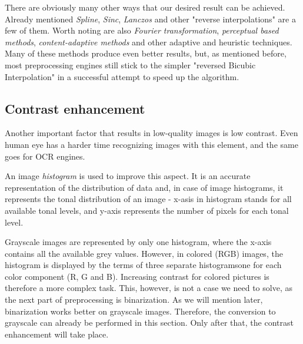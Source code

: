 \begin{description}
There are obviously many other ways that our desired result can be achieved. Already mentioned \emph{Spline}, \emph{Sinc}, \emph{Lanczos} and other "reverse interpolations" are a few of them. Worth noting are also \emph{Fourier transformation}, \emph{perceptual based methods}, \emph{content-adaptive methods} and other adaptive and heuristic techniques.
Many of these methods produce even better results, but, as mentioned before, most preprocessing engines still stick to the simpler "reversed Bicubic Interpolation" in a successful attempt to speed up the algorithm.

\end{description}

\subsection{Contrast enhancement}

Another important factor that results in low-quality images is low contrast. Even human eye has a harder time recognizing images 
with this element, and the same goes for OCR engines. 

An image \emph{histogram} is used to improve this aspect. It is an accurate representation of the distribution of data and, in case of image histograms, it represents the tonal distribution of an image - x-asis in histogram stands for all available tonal levels, and y-axis represents the number of pixels for each tonal level.

Grayscale images are represented by only one histogram, where the x-axis contains all the available grey values. However, in colored (RGB) images, the histogram is displayed by the terms of three separate histograms\xxx{ - }one for each color component (R, G and B). Increasing contrast for colored pictures is therefore a more complex task. This, however, is not a case we need to solve, as the next part of preprocessing is binarization. As we will mention later, binarization works better on grayscale images. Therefore, the conversion to grayscale can already be performed in this section. Only after that, the contrast enhancement will take place.

